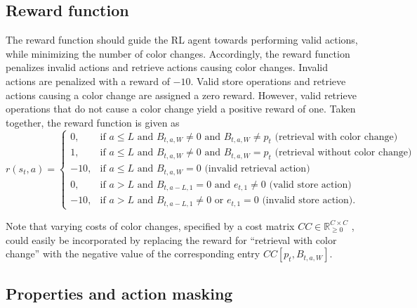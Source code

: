 \documentclass[11pt]{elsarticle}
\begin{document}

\subsection{Reward function}

The reward function should guide the RL agent towards performing valid actions, while minimizing the number of color changes. Accordingly, the reward function penalizes invalid actions and retrieve actions causing color changes. Invalid actions are penalized with a reward of $-10$. Valid store operations and retrieve actions causing a color change are assigned a zero reward. However, valid retrieve operations that do not cause a color change yield a positive reward of one. Taken together, the reward function is given as
\begin{equation} 
r(s_{t},a)=\begin{cases}
0, &\text{if } a \leq L \text{ and } B_{t,a,W}\neq 0 \text{ and } B_{t,a,W} \neq p_t \text{ (retrieval with color change)}  \\
1, &\text{if } a \leq L \text{ and } B_{t,a,W}\neq 0\text{ and } B_{t,a,W}=p_t \text{ (retrieval without color change)}\\
-10, &\text{if } a \leq L \text{ and } B_{t,a,W}=0 \text{ (invalid retrieval action)} \\
0, &\text{if } a > L \text{ and } B_{t,a-L,1}= 0 \text{ and } e_{t,1} \neq 0 \text{ (valid store action)}\\
-10, &\text{if } a > L \text{ and } B_{t,a-L,1} \neq 0 \text{ or } e_{t,1} = 0 \text{ (invalid store action)}. 
\end{cases}
\label{reward-function} 
\end{equation}

Note that varying costs of color changes, specified by a cost matrix $CC \in \mathbb{R}_{\geq 0}^{C \times C}$ \citep[e.g.,][]{Leng.2020,Leng.2023}, could easily be incorporated by replacing the reward for ``retrieval with color change'' with the negative value of the corresponding entry $CC[p_t,B_{t,a,W}]$.

\subsection{Properties and action masking}
\label{section:Action-masking}
\end{document}
